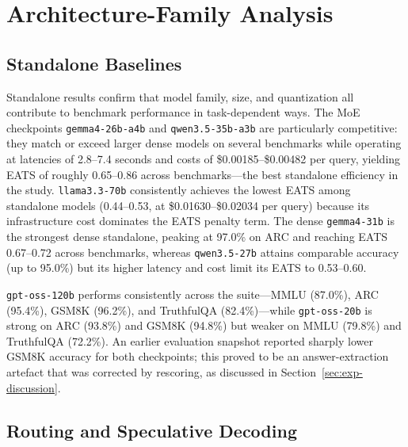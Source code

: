\section{Architecture-Family Analysis}
\label{sec:arch-analysis}

\subsection{Standalone Baselines}

Standalone results confirm that model family, size, and quantization all contribute to benchmark performance in task-dependent ways. The MoE checkpoints \texttt{gemma4-26b-a4b} and \texttt{qwen3.5-35b-a3b} are particularly competitive: they match or exceed larger dense models on several benchmarks while operating at latencies of 2.8--7.4 seconds and costs of \$0.00185--\$0.00482 per query, yielding EATS of roughly 0.65--0.86 across benchmarks---the best standalone efficiency in the study. \texttt{llama3.3-70b} consistently achieves the lowest EATS among standalone models (0.44--0.53, at \$0.01630--\$0.02034 per query) because its infrastructure cost dominates the EATS penalty term. The dense \texttt{gemma4-31b} is the strongest dense standalone, peaking at 97.0\% on ARC and reaching EATS 0.67--0.72 across benchmarks, whereas \texttt{qwen3.5-27b} attains comparable accuracy (up to 95.0\%) but its higher latency and cost limit its EATS to 0.53--0.60.

\texttt{gpt-oss-120b} performs consistently across the suite---MMLU (87.0\%), ARC (95.4\%), GSM8K (96.2\%), and TruthfulQA (82.4\%)---while \texttt{gpt-oss-20b} is strong on ARC (93.8\%) and GSM8K (94.8\%) but weaker on MMLU (79.8\%) and TruthfulQA (72.2\%). An earlier evaluation snapshot reported sharply lower GSM8K accuracy for both checkpoints; this proved to be an answer-extraction artefact that was corrected by rescoring, as discussed in Section~\ref{sec:exp-discussion}.

\subsection{Routing and Speculative Decoding}

